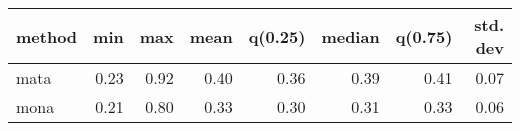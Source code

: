 \begin{tabular}{lrrrrrrr}
\hline
 method   &   min &   max &   mean &   q(0.25) &   median &   q(0.75) &   std. dev \\
\hline
 mata     &  0.23 &  0.92 &   0.40 &      0.36 &     0.39 &      0.41 &       0.07 \\
 mona     &  0.21 &  0.80 &   0.33 &      0.30 &     0.31 &      0.33 &       0.06 \\
\hline
\end{tabular}
